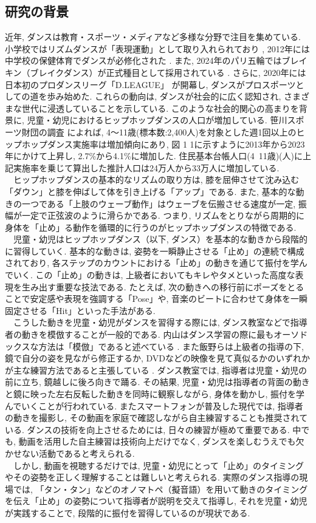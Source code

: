\documentclass[paper]{ieicej}
\begin{document}
\subsection{研究の背景}
近年, ダンスは教育・スポーツ・メディアなど多様な分野で注目を集めている. 小学校ではリズムダンスが「表現運動」として取り入れられており \cite{ref1}, 2012年には中学校の保健体育でダンスが必修化された \cite{ref2}. また, 2024年のパリ五輪ではブレイキン（ブレイクダンス）が正式種目として採用されている \cite{ref3}. さらに, 2020年には日本初のプロダンスリーグ「D.LEAGUE」 \cite{ref4}が開幕し, ダンスがプロスポーツとしての道を歩み始めた. これらの動向は, ダンスが社会的に広く認知され, さまざまな世代に浸透していることを示している. このような社会的関心の高まりを背景に, 児童・幼児におけるヒップホップダンスの人口が増加している. 笹川スポーツ財団の調査 \cite{ref5} によれば, 4〜11歳(標本数:2,400人)を対象とした週1回以上のヒップホップダンス実施率は増加傾向にあり, 図 1 1に示すように2013年から2023年にかけて上昇し, 2.7\%から4.1\%に増加した. 住民基本台帳人口(4~11歳)(人)に上記実施率を乗じて算出した推計人口は24万人から33万人に増加している. \\
　ヒップホップダンスの基本的なリズムの取り方は, 膝を屈伸させて沈み込む「ダウン」と膝を伸ばして体を引き上げる「アップ」である\cite{ref7}. また, 基本的な動きの一つである「上肢のウェーブ動作」はウェーブを伝搬させる速度が一定, 振幅が一定で正弦波のように滑らかである. つまり, リズムをとりながら周期的に身体を「止め」る動作を循環的に行うのがヒップホップダンスの特徴である. \\
　児童・幼児はヒップホップダンス（以下, ダンス）を基本的な動きから段階的に習得していく. 基本的な動きは, 姿勢を一瞬静止させる「止め」の連続で構成されており, 各ステップのカウントにおける「止め」の動きを通じて振付を学んでいく. この「止め」の動きは, 上級者においてもキレやタメといった高度な表現を生み出す重要な技法である. \cite{ref6} \cite{ref7} たとえば, 次の動きへの移行前にポーズをとることで安定感や表現を強調する「Pose」や, 音楽のビートに合わせて身体を一瞬固定させる「Hit」といった手法がある. \\
　こうした動きを児童・幼児がダンスを習得する際には, ダンス教室などで指導者の動きを模倣することが一般的である. 内山はダンス学習の際に最もオーソドックスな方法は「模倣」であると述べている \cite{ref8}. また飯野らは上級者の指導の下, 鏡で自分の姿を見ながら修正するか, DVDなどの映像を見て真似るかのいずれかが主な練習方法であると主張している \cite{ref9}. ダンス教室では, 指導者は児童・幼児の前に立ち, 鏡越しに後ろ向きで踊る. その結果, 児童・幼児は指導者の背面の動きと鏡に映った左右反転した動きを同時に観察しながら, 身体を動かし, 振付を学んでいくことが行われている. またスマートフォンが普及した現代では, 指導者の動きを撮影し, その動画を家庭で確認しながら自主練習することも推奨されている. ダンスの技術を向上させるためには, 日々の練習が極めて重要である. 中でも, 動画を活用した自主練習は技術向上だけでなく, ダンスを楽しむうえでも欠かせない活動であると考えられる.  \\
　しかし, 動画を視聴するだけでは, 児童・幼児にとって「止め」のタイミングやその姿勢を正しく理解することは難しいと考えられる. 実際のダンス指導の現場では, 「タン・タン」などのオノマトペ（擬音語）を用いて動きのタイミングを伝え「止め」の姿勢について指導者が説明を交えて指導し, それを児童・幼児が実践することで, 段階的に振付を習得しているのが現状である. 
\end{document}
